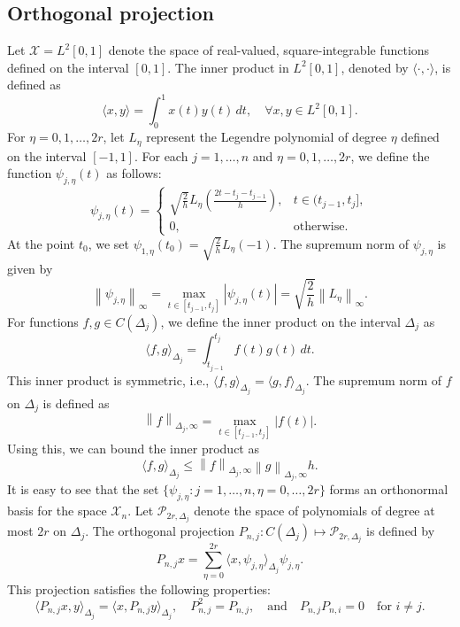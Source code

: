 \documentclass[pdflatex, sn-mathphys-num]{sn-jnl}%
\newcommand{\norm}[1]{\left\lVert #1\right\rVert}
\theoremstyle{thmstyleone}%
\theoremstyle{thmstyletwo}%
\theoremstyle{thmstylethree}%
\begin{document}
\subsection{Orthogonal projection}

Let $\mathcal{X} = L^2[0, 1]$ denote the space of real-valued, square-integrable functions defined on the interval $[0, 1]$. The inner product in $L^2[0, 1]$, denoted by $\langle \cdot, \cdot \rangle$, is defined as  
\[
\langle x, y \rangle = \int_0^1 x(t) y(t) \, dt, \quad \forall x, y \in L^2[0, 1].
\]
For \(\eta = 0, 1, \ldots, 2r\), let \(L_{\eta}\) represent the Legendre polynomial of degree \(\eta\) defined on the interval \([-1,1]\). For each \(j = 1, \ldots, n\) and \(\eta = 0, 1, \ldots, 2r\), we define the function \(\psi_{j,\eta}(t)\) as follows:
\[
\psi_{j,\eta}(t) =
\begin{cases}
	\sqrt{\frac{2}{h}} L_{\eta} \left( \frac{2t - t_j - t_{j-1}}{h} \right), & t \in (t_{j-1}, t_j], \\
	0, & \text{otherwise}.
\end{cases}
\]
At the point \(t_0\), we set \(\psi_{1,\eta}(t_0) = \sqrt{\frac{2}{h}} L_{\eta}(-1)\). The supremum norm of \(\psi_{j,\eta}\) is given by
\[
\norm{\psi_{j,\eta}}_{\infty} = \max_{t \in [t_{j-1}, t_j]} |\psi_{j,\eta}(t)| = \sqrt{\frac{2}{h}} \norm{L_{\eta}}_{\infty}.
\]
For functions \(f, g \in C(\Delta_j)\), we define the inner product on the interval \(\Delta_j\) as
\[
\langle f, g \rangle_{\Delta_j} = \int_{t_{j-1}}^{t_j} f(t) g(t) \, dt.
\]
This inner product is symmetric, i.e., \(\langle f, g \rangle_{\Delta_j} = \langle g, f \rangle_{\Delta_j}\). The supremum norm of \(f\) on \(\Delta_j\) is defined as
\[
\norm{f}_{\Delta_j, \infty} = \max_{t \in [t_{j-1}, t_j]} |f(t)|.
\]
Using this, we can bound the inner product as
\[
\langle f, g \rangle_{\Delta_j} \leq \norm{f}_{\Delta_j, \infty} \norm{g}_{\Delta_j, \infty} h. 
\]
It is easy to see that the set \(\{\psi_{j,\eta}: j = 1, \ldots, n, \eta = 0, \ldots, 2r\}\) forms an orthonormal basis for the space \(\mathcal{X}_n\). Let \(\mathcal{P}_{2r, \Delta_j}\) denote the space of polynomials of degree at most \(2r\) on \(\Delta_j\). The orthogonal projection \(P_{n,j} : C(\Delta_j) \mapsto \mathcal{P}_{2r, \Delta_j}\) is defined by
\[
P_{n,j} x = \sum_{\eta=0}^{2r} \langle x, \psi_{j,\eta} \rangle_{\Delta_j} \psi_{j,\eta}.
\]
This projection satisfies the following properties:
\[
\langle P_{n,j} x, y \rangle_{\Delta_j} = \langle x, P_{n,j} y \rangle_{\Delta_j}, \quad P_{n,j}^2 = P_{n,j}, \quad \text{and} \quad P_{n,j} P_{n,i} = 0 \quad \text{for } i \neq j.
\]
\end{document}
